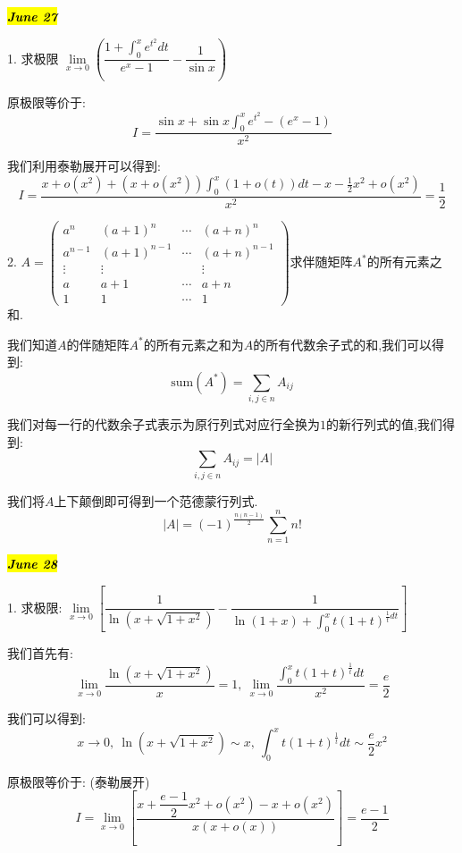 
\hl{\textbf{\textit{June 27}}}

1. 求极限 $\lim\limits_{x\rightarrow 0}\left( \dfrac{1+\int_{0}^{x}e^{t^2}dt}{e^x-1}-\dfrac{1}{\sin x}\right) $
\begin{solution}
	
	原极限等价于: 
	$$I=\dfrac{\sin x+\sin x\int_{0}^{x}e^{t^2}-(e^x-1)}{x^2}$$
	
	我们利用泰勒展开可以得到: 
	$$I=\dfrac{x+o(x^2)+(x+o(x^2))\int_{0}^{x}(1+o(t))dt-x-\frac{1}{2}x^2+o(x^2)}{x^2}=\dfrac{1}{2}$$
\end{solution}


2. $A=\left( \begin{matrix}
	a^n&(a+1)^n&\cdots&(a+n)^n\\
	a^{n-1}&(a+1)^{n-1}&\cdots&(a+n)^{n-1}\\
	\vdots&\vdots& &\vdots\\
	a&a+1&\cdots&a+n\\
	1&1&\cdots&1
\end{matrix}\right) $\quad 求伴随矩阵$A^{*}$的所有元素之和.
\begin{solution}
	
	我们知道$A$的伴随矩阵$A^{*}$的所有元素之和为$A$的所有代数余子式的和,我们可以得到: 
	$$\text{sum}(A^{*})=\sum\limits_{i,j\in n}A_{ij}$$
	
	我们对每一行的代数余子式表示为原行列式对应行全换为$1$的新行列式的值,我们得到: 
	$$\sum\limits_{i,j\in n}A_{ij}=|A|$$
	
	我们将$A$上下颠倒即可得到一个范德蒙行列式.
	$$|A|=(-1)^{\frac{n(n-1)}{2}}\sum\limits_{n=1}^{n}n!$$
\end{solution}


\hl{\textbf{\textit{June 28}}}

1. 求极限: $\lim\limits_{x\rightarrow 0}\left[ \dfrac{1}{\ln(x+\sqrt{1+x^2})}-\dfrac{1}{\ln(1+x)+\int_{0}^{x}t(1+t)^{\frac{1}{t}dt}}\right]$
\begin{solution}
	
	我们首先有: 
	$$\lim\limits_{x\rightarrow 0}\dfrac{\ln(x+\sqrt{1+x^2})}{x}=1,\ \lim\limits_{x\rightarrow 0}\dfrac{\int_{0}^{x}t(1+t)^{\frac{1}{t}}dt}{x^2}=\frac{e}{2}$$
	
	我们可以得到: 
	$$x\rightarrow 0,\ \ln(x+\sqrt{1+x^2})\sim x,\ \int_{0}^{x}t(1+t)^{\frac{1}{t}}dt\sim \dfrac{e}{2}x^2$$
	
	原极限等价于: (泰勒展开)
	$$I=\lim\limits_{x\rightarrow 0}\left[ \dfrac{x+\dfrac{e-1}{2}x^2+o(x^2)-x+o(x^2)}{x(x+o(x))}\right]=\dfrac{e-1}{2}$$
\end{solution}


